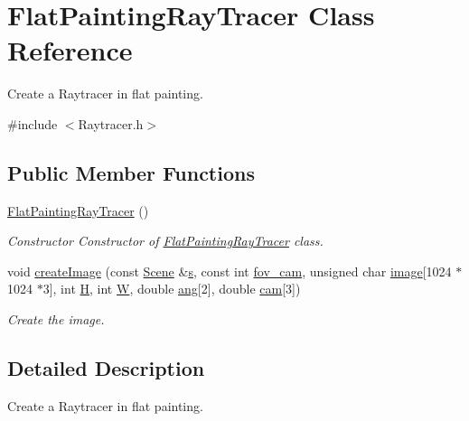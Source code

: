 \hypertarget{classFlatPaintingRayTracer}{}\section{Flat\+Painting\+Ray\+Tracer Class Reference}
\label{classFlatPaintingRayTracer}


Create a Raytracer in flat painting.  




{\ttfamily \#include $<$Raytracer.\+h$>$}

\subsection*{Public Member Functions}
\begin{DoxyCompactItemize}
\item 
\mbox{\label{classFlatPaintingRayTracer_aa75768f1962f246207bf43e7daaf825f}} 
\hyperlink{classFlatPaintingRayTracer_aa75768f1962f246207bf43e7daaf825f}{Flat\+Painting\+Ray\+Tracer} ()
\begin{DoxyCompactList}\small\item\em Constructor Constructor of \hyperlink{classFlatPaintingRayTracer}{Flat\+Painting\+Ray\+Tracer} class. \end{DoxyCompactList}\item 
void \hyperlink{classFlatPaintingRayTracer_a07aa98cec7650f0716a102d9f0fbe246}{create\+Image} (const \hyperlink{classScene}{Scene} \&\hyperlink{Main_8cpp_aecc1396fc611f6e71d5d70228e7b089a}{s}, const int \hyperlink{Main_8cpp_afac324b61ac0563c734fcdb81d98e344}{fov\+\_\+cam}, unsigned char \hyperlink{Main_8cpp_a92ebae258b9cd4407b2510c3d18633ee}{image}\mbox{[}1024 $\ast$1024 $\ast$3\mbox{]}, int \hyperlink{Main_8cpp_affa487e8e3cc48473cfc05c0ce0165e9}{H}, int \hyperlink{Main_8cpp_a2dd51e03005d5cb52315290d27f61870}{W}, double \hyperlink{Main_8cpp_a861ee06bf1e430650b4437260a119635}{ang}\mbox{[}2\mbox{]}, double \hyperlink{Main_8cpp_a9fe883a18727d129289b149e5f0305eb}{cam}\mbox{[}3\mbox{]})
\begin{DoxyCompactList}\small\item\em Create the image. \end{DoxyCompactList}\end{DoxyCompactItemize}


\subsection{Detailed Description}
Create a Raytracer in flat painting. 

